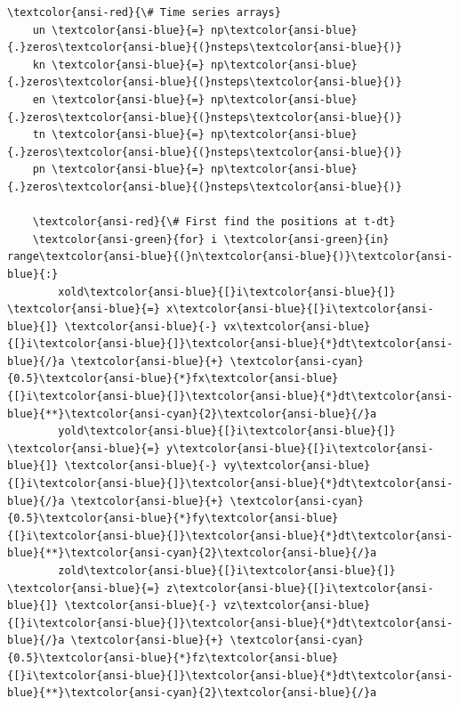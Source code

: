 \documentclass[11pt]{article}
\begin{document}
\begin{Verbatim}[commandchars=\\\{\}]
    \textcolor{ansi-red}{\# Time series arrays}
    un \textcolor{ansi-blue}{=} np\textcolor{ansi-blue}{.}zeros\textcolor{ansi-blue}{(}nsteps\textcolor{ansi-blue}{)}
    kn \textcolor{ansi-blue}{=} np\textcolor{ansi-blue}{.}zeros\textcolor{ansi-blue}{(}nsteps\textcolor{ansi-blue}{)}
    en \textcolor{ansi-blue}{=} np\textcolor{ansi-blue}{.}zeros\textcolor{ansi-blue}{(}nsteps\textcolor{ansi-blue}{)}
    tn \textcolor{ansi-blue}{=} np\textcolor{ansi-blue}{.}zeros\textcolor{ansi-blue}{(}nsteps\textcolor{ansi-blue}{)}
    pn \textcolor{ansi-blue}{=} np\textcolor{ansi-blue}{.}zeros\textcolor{ansi-blue}{(}nsteps\textcolor{ansi-blue}{)}

    \textcolor{ansi-red}{\# First find the positions at t-dt}
    \textcolor{ansi-green}{for} i \textcolor{ansi-green}{in} range\textcolor{ansi-blue}{(}n\textcolor{ansi-blue}{)}\textcolor{ansi-blue}{:}
        xold\textcolor{ansi-blue}{[}i\textcolor{ansi-blue}{]} \textcolor{ansi-blue}{=} x\textcolor{ansi-blue}{[}i\textcolor{ansi-blue}{]} \textcolor{ansi-blue}{-} vx\textcolor{ansi-blue}{[}i\textcolor{ansi-blue}{]}\textcolor{ansi-blue}{*}dt\textcolor{ansi-blue}{/}a \textcolor{ansi-blue}{+} \textcolor{ansi-cyan}{0.5}\textcolor{ansi-blue}{*}fx\textcolor{ansi-blue}{[}i\textcolor{ansi-blue}{]}\textcolor{ansi-blue}{*}dt\textcolor{ansi-blue}{**}\textcolor{ansi-cyan}{2}\textcolor{ansi-blue}{/}a
        yold\textcolor{ansi-blue}{[}i\textcolor{ansi-blue}{]} \textcolor{ansi-blue}{=} y\textcolor{ansi-blue}{[}i\textcolor{ansi-blue}{]} \textcolor{ansi-blue}{-} vy\textcolor{ansi-blue}{[}i\textcolor{ansi-blue}{]}\textcolor{ansi-blue}{*}dt\textcolor{ansi-blue}{/}a \textcolor{ansi-blue}{+} \textcolor{ansi-cyan}{0.5}\textcolor{ansi-blue}{*}fy\textcolor{ansi-blue}{[}i\textcolor{ansi-blue}{]}\textcolor{ansi-blue}{*}dt\textcolor{ansi-blue}{**}\textcolor{ansi-cyan}{2}\textcolor{ansi-blue}{/}a
        zold\textcolor{ansi-blue}{[}i\textcolor{ansi-blue}{]} \textcolor{ansi-blue}{=} z\textcolor{ansi-blue}{[}i\textcolor{ansi-blue}{]} \textcolor{ansi-blue}{-} vz\textcolor{ansi-blue}{[}i\textcolor{ansi-blue}{]}\textcolor{ansi-blue}{*}dt\textcolor{ansi-blue}{/}a \textcolor{ansi-blue}{+} \textcolor{ansi-cyan}{0.5}\textcolor{ansi-blue}{*}fz\textcolor{ansi-blue}{[}i\textcolor{ansi-blue}{]}\textcolor{ansi-blue}{*}dt\textcolor{ansi-blue}{**}\textcolor{ansi-cyan}{2}\textcolor{ansi-blue}{/}a


\end{Verbatim}
\end{document}
